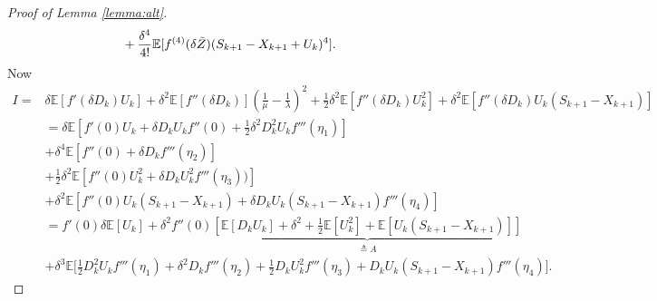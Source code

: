 \documentclass[11pt,letterpaper,reqno]{article}
\theoremstyle{thmstyleone}%
\theoremstyle{thmstyletwo}%
\theoremstyle{thmstylethree}%
\numberwithin{equation}{section}
\begin{document}
\begin{proof}[Proof of Lemma \ref{lemma:alt}]
\begin{align}
&+\frac{\delta^4}{4!}\mathbb E[f^{(4)}(\delta \Tilde{Z})(S_{k+1}-X_{k+1}+U_k)^4].
\end{align}
Now
\begin{align}\label{ln10}
    I=&\delta \mathbb E[f'(\delta D_k)U_k]+\delta^2 \mathbb E[f''(\delta D_k)]\left(\frac{1}{\mu}-\frac{1}{\lambda}\right)^2 +\frac{1}{2}\delta^2 \mathbb E[f''(\delta D_k)U_k^2]+\delta^2 \mathbb E[f''(\delta D_k)U_k(S_{k+1}-X_{k+1})] \nonumber\\
    &=\delta \mathbb E\left[f'(0)U_k+\delta D_kU_kf''(0)+\frac{1}{2}\delta^2D_k^2U_kf'''(\eta_1)\right]\nonumber \\
    &+\delta^4 \mathbb E\left[f''(0)+\delta D_kf'''(\eta_2)\right]\nonumber \\
    &+\frac{1}{2}\delta^2 \mathbb E\left[f''(0)U_k^2+\delta D_k U_k^2f'''(\eta_3))\right]\nonumber \\
    &+\delta^2 \mathbb E\left[f''(0)U_k(S_{k+1}-X_{k+1})+\delta D_k U_k(S_{k+1}-X_{k+1})f'''(\eta_4)\right]\nonumber \\
    &=f'(0) \delta \mathbb E[U_k]+\delta^2f''(0)\underbrace{\left[ \mathbb E[D_kU_k]+\delta^2+\frac{1}{2}\mathbb E[U_k^2]+\mathbb E[U_k(S_{k+1}-X_{k+1})] \right]}_{\triangleq A}\nonumber \\
    &+\delta^3 \mathbb E \bigg[\frac{1}{2}D_k^2U_kf'''(\eta_1)+\delta^2 D_k f'''(\eta_2) +\frac{1}{2}D_kU_k^2f'''(\eta_3)+D_kU_k(S_{k+1}-X_{k+1})f'''(\eta_4)\bigg].
\end{align}


\end{proof}
\end{document}
